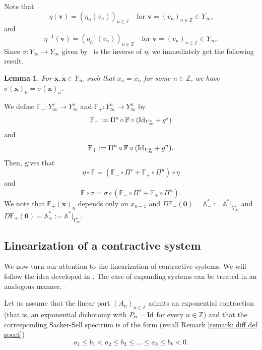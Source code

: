 \documentclass[reqno, a4paper, 10pt]{amsart}
\theoremstyle{plain}
\numberwithin{equation}{section}
\newtheorem{lemma}{Lemma}
\theoremstyle{remark}
\def\Id{\text{\rm Id}}
\def\Z{\mathbb{Z}}
\begin{document}
Note that
\[
\eta(\mathbf  v)=(\eta_n(v_n))_{n\in \mathbb Z} \quad \text{for $\mathbf v=(v_n)_{n\in \mathbb Z}\in Y_\infty$,}
\]
and 
\[
\eta^{-1}(\mathbf  v)=(\eta_n^{-1}(v_n))_{n\in \mathbb Z} \quad \text{for $\mathbf v=(v_n)_{n\in \mathbb Z}\in Y_\infty$.}
\]
Since $\sigma\colon Y_\infty \to Y_\infty$ given by~\cite[Lemma 3.1]{BT} is the inverse of $\eta$, we immediately get the following result.
\begin{lemma}
For $\mathbf x, \tilde{\mathbf x}\in Y_\infty$ such that $x_n=\tilde x_n$ for some $n\in \Z$, we have $\sigma(\mathbf x)_n=\sigma(\tilde{\mathbf x})_n$.
\end{lemma}

We define $\mathbb F_{-}\colon Y_\infty^s \to Y_\infty^s$ and $\mathbb F_+\colon Y_\infty^u \to Y_\infty^u$ by 
\begin{equation*}\label{F1}
\mathbb F_{-}:=\Pi^s \circ \mathbb F\circ (\Id_{Y_\infty^s}+g^s)
\end{equation*}
and 
\begin{equation*}\label{F2}
\mathbb F_+:=\Pi^u \circ \mathbb F\circ (\Id_{Y_\infty^u}+g^u).
\end{equation*}
Then, \cite[Lemma 3.2]{BT} gives that
\begin{equation}\label{lin1}
\eta\circ \mathbb F=(\mathbb F_{-}\circ \Pi^s+\mathbb F_+\circ \Pi^u)\circ \eta
\end{equation}
and
\[
\mathbb F\circ \sigma=\sigma \circ (\mathbb F_{-}\circ \Pi^s+\mathbb F_+\circ \Pi^u).
\]
We note that $\mathbb F_{\pm}(\mathbf x)_n$ depends only on $x_{n-1}$ and $D\mathbb F_{-}(\mathbf 0)=\mathbb A_-^\ast:=\mathbb A^\ast\rvert_{Y_\infty^s}$ and $D\mathbb F_+(\mathbf 0)=\mathbb A_+^\ast:=\mathbb A^\ast\rvert_{Y_\infty^u}$.






\subsection{Linearization of a contractive system}\label{sec: linear contraction}
We now turn our attention to the linearization of contractive systems. We will follow the idea developed in \cite[Sections 5 and 7]{ZZJ}. The case of expanding systems can be treated in an analogous manner.

Let us assume that the linear part $(A_n)_{n\in \mathbb Z}$ admits an exponential contraction (that is, an exponential dichotomy with $P_n=\Id$ for every $n\in\Z$) and that the corresponding Sacker-Sell spectrum is of the form (recall Remark \ref{remark: diff def spect})
\[
a_1\le b_1<a_2\le b_2\le \ldots \le a_k\le b_k <0.
\]
\end{document}
